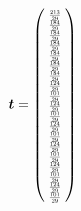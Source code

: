 $$
\bm{t} = 
\left ( \scalemath{0.6} { \begin{array}{c}
\frac{213}{29}\\
\frac{184}{29}\\
\frac{184}{29}\\
\frac{184}{29}\\
\frac{184}{29}\\
\frac{184}{29}\\
\frac{184}{29}\\
\frac{124}{29}\\
\frac{101}{29}\\
\frac{124}{29}\\
\frac{101}{29}\\
\frac{124}{29}\\
\frac{101}{29}\\
\frac{124}{29}\\
\frac{101}{29}\\
\frac{124}{29}\\
\frac{101}{29}\\
\frac{124}{29}\\
\frac{101}{29}\\
\end{array} } \right)
$$

